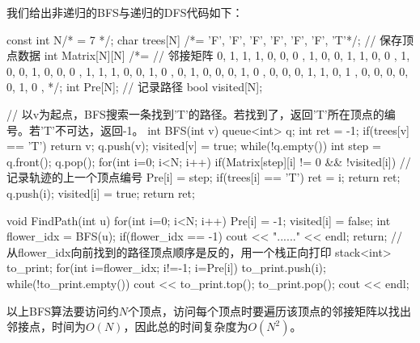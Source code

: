我们给出非递归的BFS与递归的DFS代码如下：
\begin{cppcodeNum}[codetitle={非递归的BFS解法}]
    const int N/* = 7 */;
    char trees[N] /*= {'F', 'F', 'F', 'F', 'F', 'F', 'T'}*/;    // 保存顶点数据
    int Matrix[N][N] /*= {    // 邻接矩阵
        { 0, 1, 1, 1, 0, 0, 0 },
        { 1, 0, 0, 1, 1, 0, 0 },
        { 1, 0, 0, 1, 0, 0, 0 },
        { 1, 1, 1, 0, 0, 1, 0 },
        { 0, 1, 0, 0, 0, 1, 0 },
        { 0, 0, 0, 1, 1, 0, 1 },
        { 0, 0, 0, 0, 0, 1, 0 },
    }*/;
    int Pre[N]; // 记录路径
    bool visited[N];

    // 以v为起点，BFS搜索一条找到'T'的路径。若找到了，返回'T'所在顶点的编号。若'T'不可达，返回-1。
    int BFS(int v) {
        queue<int> q;
        int ret = -1;
        if(trees[v] == 'T') {
            return v;
        }
        q.push(v);
        visited[v] = true;
        while(!q.empty()) {
            int step = q.front();
            q.pop();
            for(int i=0; i<N; i++) {
                if(Matrix[step][i] != 0 && !visited[i]) {
                    // 记录轨迹的上一个顶点编号
                    Pre[i] = step;
                    if(trees[i] == 'T') {
                        ret = i;
                        return ret;
                    }
                    q.push(i);
                    visited[i] = true;
                }
            }
        }
        return ret;
    }

    void FindPath(int u) {
        for(int i=0; i<N; i++) {
            Pre[i] = -1;
            visited[i] = false;
        }
        int flower_idx = BFS(u);
        if(flower_idx == -1) {
            cout << "......" << endl;
            return;
        }
        // 从flower_idx向前找到的路径顶点顺序是反的，用一个栈正向打印
        stack<int> to_print;
        for(int i=flower_idx; i!=-1; i=Pre[i]) {
            to_print.push(i);
        }
        while(!to_print.empty()) {
            cout << to_print.top();
            to_print.pop();
        }
        cout << endl;
    }
\end{cppcodeNum}
以上BFS算法要访问约$N$个顶点，访问每个顶点时要遍历该顶点的邻接矩阵以找出邻接点，时间为$O(N)$，因此总的时间复杂度为$O(N^2)$。

